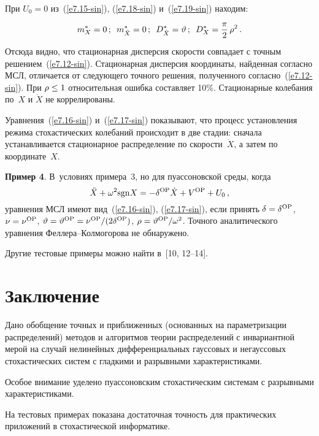 \begin{multicols}{2}
При $U_0 =0$ из~(\ref{e7.15-sin}), (\ref{e7.18-sin}) и~(\ref{e7.19-sin}) находим:
\begin{equation*}
m_X^* =0\,;\enskip 
m_{\dot X}^* =0\,; \enskip 
D_{\dot X}^* =\vartheta\,;\enskip 
D_X^* =  \fr{\pi}{2}\,\rho^2\,. %
\end{equation*}
Отсюда видно, что стационарная дисперсия скорости совпадает с точным
решением~(\ref{e7.12-sin}). Стационарная дисперсия координаты, найденная
согласно МСЛ, отличается от следующего точного решения, полученного
согласно~(\ref{e7.12-sin}). При $\rho\hm \le 1$ относительная ошибка составляет
10\%. Стационарные колебания по~$X$ и $\dot X$ не коррелированы.

Уравнения~(\ref{e7.16-sin}) и~(\ref{e7.17-sin}) показывают, что процесс установления 
режима стохастических колебаний происходит в две стадии: сначала устанавливается 
стационарное распределение по ско\-рости~$\dot X$, а затем по координате~$X$.

\medskip

\noindent
\textbf{Пример 4}.  В~условиях примера~3, но для пуассоновской среды, когда
    \begin{equation*}
    \ddot X +\omega^2 {\mathrm{sgn}} X =-\delta^{\mathrm{OP}} \dot X + 
    V^{\mathrm{OP}} + U_0\,,
    \end{equation*}
уравнения МСЛ имеют вид~(\ref{e7.16-sin}), (\ref{e7.17-sin}), если принять 
$\delta\hm= \delta^{\mathrm{OP}}$, $ \nu\hm=\nu^{\mathrm{OP}}$, 
$\vartheta\hm=\vartheta^{\mathrm{OP}}\hm=\nu^{\mathrm{OP}}/(2\delta^{\mathrm{OP}})$, 
$\rho \hm=\vartheta^{\mathrm{OP}}/\w^2$. Точного аналитического уравнения 
Фел\-ле\-ра--Кол\-мо\-го\-ро\-ва не обнаружено.

Другие тестовые примеры можно найти в~[10, 12--14].

\section{Заключение}

Дано обобщение точных и приближенных (основанных на параметризации распределений)\linebreak 
методов и алгоритмов теории распределений с инвари\-антной мерой на случай нелинейных 
дифференциальных гауссовых и негауссовых стохастических систем с гладкими и разрывными 
характеристиками.

Особое внимание уделено пуассоновским стохастическим системам с разрывными характеристиками.

На тестовых примерах показана достаточная точность для практических приложений в стохастической 
информатике.


\end{multicols}
